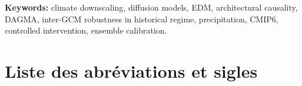 \documentclass[14pt,a4paper,openany]{extreport}
\theoremstyle{definition}
\begin{document}
\noindent\textbf{Keywords:} climate downscaling, diffusion models, EDM, architectural causality, DAGMA, inter-GCM robustness in historical regime, precipitation, CMIP6, controlled intervention, ensemble calibration.

\endgroup

\clearpage
\chapter*{Liste des abréviations et sigles}
\end{document}

